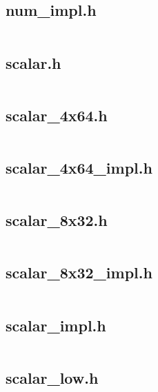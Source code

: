 \documentclass{article}
\begin{document}
\subsection{num\_impl.h}
\inputminted{cpp}{/home/dufferzafar/dev/@clones/bitcoin/src/secp256k1/src/num_impl.h}
\newpage

\subsection{scalar.h}
\inputminted{cpp}{/home/dufferzafar/dev/@clones/bitcoin/src/secp256k1/src/scalar.h}
\newpage

\subsection{scalar\_4x64.h}
\inputminted{cpp}{/home/dufferzafar/dev/@clones/bitcoin/src/secp256k1/src/scalar_4x64.h}
\newpage

\subsection{scalar\_4x64\_impl.h}
\inputminted{cpp}{/home/dufferzafar/dev/@clones/bitcoin/src/secp256k1/src/scalar_4x64_impl.h}
\newpage

\subsection{scalar\_8x32.h}
\inputminted{cpp}{/home/dufferzafar/dev/@clones/bitcoin/src/secp256k1/src/scalar_8x32.h}
\newpage

\subsection{scalar\_8x32\_impl.h}
\inputminted{cpp}{/home/dufferzafar/dev/@clones/bitcoin/src/secp256k1/src/scalar_8x32_impl.h}
\newpage

\subsection{scalar\_impl.h}
\inputminted{cpp}{/home/dufferzafar/dev/@clones/bitcoin/src/secp256k1/src/scalar_impl.h}
\newpage

\subsection{scalar\_low.h}
\inputminted{cpp}{/home/dufferzafar/dev/@clones/bitcoin/src/secp256k1/src/scalar_low.h}
\newpage
\end{document}
